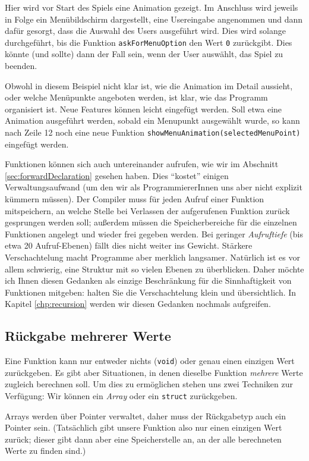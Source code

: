Hier wird vor Start des Spiels eine Animation gezeigt. Im Anschluss wird jeweils in Folge ein Menübildschirm dargestellt, eine Usereingabe angenommen und dann dafür gesorgt, dass die Auswahl des Users ausgeführt wird. Dies wird solange durchgeführt, bis die Funktion \texttt{askForMenuOption} den Wert \texttt{0} zurückgibt. Dies könnte (und sollte) \eg dann der Fall sein, wenn der User auswählt, das Spiel zu beenden.

Obwohl in diesem Beispiel nicht klar ist, wie die Animation im Detail aussieht, oder welche Menüpunkte angeboten werden, ist klar, wie das Programm organisiert ist. Neue Features können leicht eingefügt werden. Soll etwa eine Animation ausgeführt werden, sobald ein Menupunkt ausgewählt wurde, so kann nach Zeile 12 noch eine neue Funktion \texttt{showMenuAnimation(selectedMenuPoint)} eingefügt werden.

Funktionen können sich auch untereinander aufrufen, wie wir im Abschnitt \ref{sec:forwardDeclaration} gesehen haben. Dies \enquote{kostet} einigen Verwaltungsaufwand (um den wir als ProgrammiererInnen uns aber nicht explizit kümmern müssen). Der Compiler muss für jeden Aufruf einer Funktion mitspeichern, an welche Stelle bei Verlassen der aufgerufenen Funktion zurück gesprungen werden soll; außerdem müssen die Speicherbereiche für die einzelnen Funktionen angelegt und wieder frei gegeben werden. Bei geringer \emph{Aufruftiefe} (bis etwa 20 Aufruf-Ebenen) fällt dies nicht weiter ins Gewicht. Stärkere Verschachtelung macht Programme aber merklich langsamer. Natürlich ist es vor allem schwierig, eine Struktur mit so vielen Ebenen zu überblicken. Daher möchte ich Ihnen diesen Gedanken als einzige Beschränkung für die Sinnhaftigkeit von Funktionen mitgeben: halten Sie die Verschachtelung klein und übersichtlich. In Kapitel \ref{chp:recursion} werden wir diesen Gedanken nochmals aufgreifen.

\subsection{Rückgabe mehrerer Werte}
Eine Funktion kann nur entweder nichts (\texttt{void}) oder genau einen einzigen Wert zurückgeben. Es gibt aber Situationen, in denen dieselbe Funktion \emph{mehrere} Werte zugleich berechnen soll. Um dies zu ermöglichen stehen uns zwei Techniken zur Verfügung: Wir können ein \emph{Array} oder ein \texttt{struct} zurückgeben.

Arrays werden über Pointer verwaltet, daher muss der Rückgabetyp auch ein Pointer sein. (Tatsächlich gibt unsere Funktion also nur einen einzigen Wert zurück; dieser gibt dann aber eine Speicherstelle an, an der alle berechneten Werte zu finden sind.)

